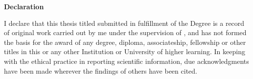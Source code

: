 
\cleardoublepage
{}

\vspace*{0.7in}

\begin{center}
  \textbf{\large Declaration}
\end{center}

\vspace*{0.5in}


%

  \noindent  I declare that this thesis titled {\bf \ThesisTitle} submitted in
  fulfillment of the Degree \Branch is a record of original work carried out by
  me under the supervision of {\bf \Supervisor}, and has not formed the basis for
  the award of any degree, diploma, associateship, fellowship or other titles in
  this or any other Institution or University of higher learning. In keeping with
  the ethical practice in reporting scientific information, due acknowledgments
  have been made wherever the findings of others have been cited.

  \vspace*{1in}

